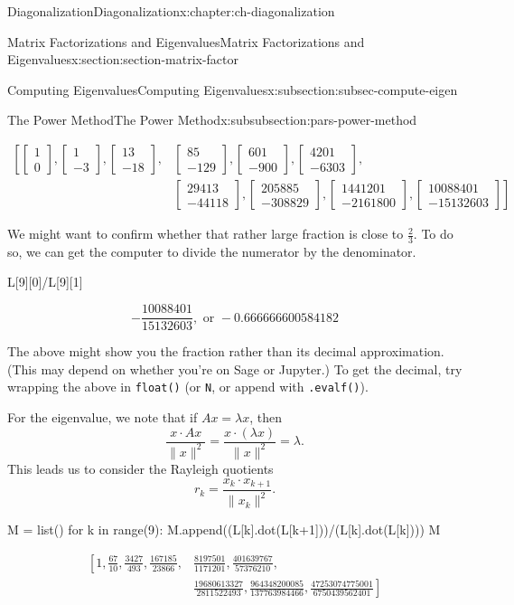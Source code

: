 \documentclass[oneside,10pt,]{book}
\newcommand{\mono}[1]{\texttt{#1}}
\numberwithin{equation}{section}
\newcommand{\bbm}{\begin{bmatrix}}
\newcommand{\ebm}{\end{bmatrix}}
\newcommand{\amp}{&}
\begin{document}
\begin{chapterptx}{Diagonalization}{}{Diagonalization}{}{}{x:chapter:ch-diagonalization}
\begin{sectionptx}{Matrix Factorizations and Eigenvalues}{}{Matrix Factorizations and Eigenvalues}{}{}{x:section:section-matrix-factor}
\begin{subsectionptx}{Computing Eigenvalues}{}{Computing Eigenvalues}{}{}{x:subsection:subsec-compute-eigen}
\begin{subsubsectionptx}{The Power Method}{}{The Power Method}{}{}{x:subsubsection:pars-power-method}
\begin{sageoutput}
\begin{align*}
\left[\bbm 1\\0\ebm, \bbm 1\\-3\ebm, \bbm 13\\-18\ebm,\right. \amp \bbm 85\\-129\ebm, \bbm 601\\-900\ebm, \bbm 4201\\-6303\ebm,\\ \amp \left.\bbm 29413\\ -44118\ebm, \bbm 205885\\-308829\ebm, \bbm 1441201\\-2161800\ebm, \bbm 10088401\\-15132603\ebm\right]
\end{align*}
\end{sageoutput}
We might want to confirm whether that rather large fraction is close to \(\frac23\). To do so, we can get the computer to divide the numerator by the denominator.%
\begin{sageinput}
L[9][0]/L[9][1]
\end{sageinput}
\begin{sageoutput}
\[-\frac{10088401}{15132603}, \text{ or } -0.666666600584182\]
\end{sageoutput}
The above might show you the fraction rather than its decimal approximation. (This may depend on whether you're on Sage or Jupyter.) To get the decimal, try wrapping the above in \mono{float()} (or \mono{N}, or append with \mono{.evalf()}).%
\par
For the eigenvalue, we note that if \(Ax=\lambda x\), then%
\begin{equation*}
\frac{x\cdot Ax}{\lVert x\rVert^2} = \frac{x\cdot (\lambda x)}{\lVert x\rVert^2} = \lambda\text{.}
\end{equation*}
This leads us to consider the Rayleigh quotients%
\begin{equation*}
r_k = \frac{x_k\cdot x_{k+1}}{\lVert x_k\rVert^2}\text{.}
\end{equation*}
%
\begin{sageinput}
M = list()
for k in range(9):
    M.append((L[k].dot(L[k+1]))/(L[k].dot(L[k])))
M
\end{sageinput}
\begin{sageoutput}
\begin{align*}
\left[1,\frac{67}{10}, \frac{3427}{493}, \frac{167185}{23866}\right.,\amp\frac{8197501}{1171201},\frac{401639767}{57376210},\\ \amp \left.\frac{19680613327}{2811522493},\frac{964348200085}{137763984466},\frac{47253074775001}{6750439562401}\right]

\end{align*}
\end{sageoutput}
\end{subsubsectionptx}
\end{subsectionptx}
\end{sectionptx}
\end{chapterptx}
\end{document}
